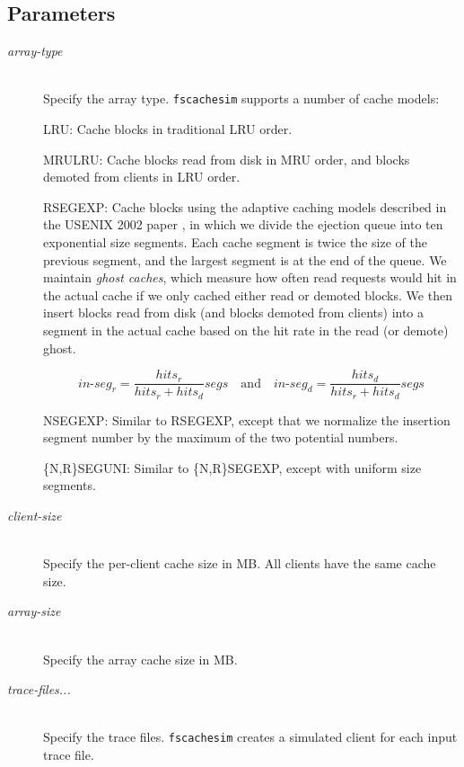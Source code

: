 \documentclass[twoside]{article}
\newcommand{\fscachesim}{\texttt{fscachesim}}
\begin{document}
\subsection{Parameters}

\begin{description}

\item[\textit{array-type}] \quad\\ Specify the array type. \fscachesim{}
supports a number of cache models:

LRU: Cache blocks in traditional LRU order.

MRULRU: Cache blocks read from disk in MRU order, and blocks demoted from
clients in LRU order.

RSEGEXP: Cache blocks using the adaptive caching models described in
the USENIX 2002 paper \cite{Wong2002}, in which we divide the ejection
queue into ten exponential size segments. Each cache segment is twice the
size of the previous segment, and the largest segment is at the end of the
queue. We maintain \emph{ghost caches}, which measure how often read
requests would hit in the actual cache if we only cached either read or
demoted blocks. We then insert blocks read from disk (and blocks demoted
from clients) into a segment in the actual cache based on the hit rate in
the read (or demote) ghost.

\begin{displaymath}
\mathit{in\mbox{-}seg}_r =
	\frac{\mathit{hits}_r}{\mathit{hits}_r + \mathit{hits}_d} \mathit{segs}
\quad\mbox{and}\quad
\mathit{in\mbox{-}seg}_d =
	\frac{\mathit{hits}_d}{\mathit{hits}_r + \mathit{hits}_d} \mathit{segs}
\end{displaymath}

NSEGEXP: Similar to RSEGEXP, except that we normalize the insertion segment
number by the maximum of the two potential numbers.

\{N,R\}SEGUNI: Similar to \{N,R\}SEGEXP, except with uniform size segments.

\item[\textit{client-size}] \quad\\ Specify the per-client cache size in
MB. All clients have the same cache size.

\item[\textit{array-size}] \quad\\ Specify the array cache size in MB.

\item[\textit{trace-files...}] \quad\\ Specify the trace files. \fscachesim{}
creates a simulated client for each input trace file.

\end{description}
\end{document}
